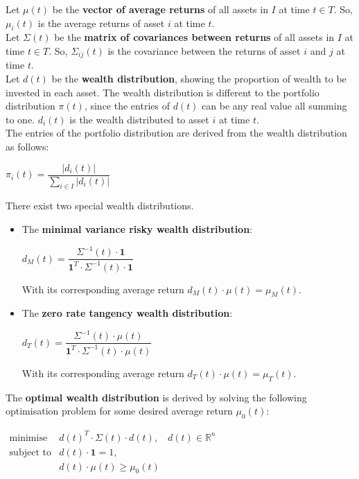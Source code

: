 \documentclass[11pt]{article}
\begin{document}
Let $\mu(t)$ be the \textbf{vector of average returns} of all assets in $I$ at time $t \in T$. So, $\mu_{i}(t)$ is the average returns of asset $i$ at time $t$.\\

Let $\Sigma(t)$ be the \textbf{matrix of covariances between returns} of all assets in $I$ at time $t \in T$. So, $\Sigma_{ij}(t)$ is the covariance between the returns of asset $i$ and $j$ at time $t$.\\

Let $d(t)$ be the \textbf{wealth distribution}, showing the proportion of wealth to be invested in each asset. The wealth distribution is different to the portfolio distribution $\pi(t)$, since the entries of $d(t)$ can be any real value all summing to one. $d_i(t)$ is the wealth distributed to asset $i$ at time $t$.\\

The entries of the portfolio distribution are derived from the wealth distribution as follows:
\begin{center}
    $\pi_i(t) = \dfrac{|d_i(t)|}{\sum_{i \in I}|d_i(t)|}$
\end{center}



\newpage

There exist two special wealth distributions.
\begin{itemize}
    \item The \textbf{minimal variance risky wealth distribution}:
    \begin{center}
        $d_M(t) = \dfrac{\Sigma^{-1}(t) \cdot \mathbf{1}}{\mathbf{1}^{T} \cdot \Sigma^{-1}(t) \cdot \mathbf{1}}$
    \end{center}
    With its corresponding average return $d_M(t) \cdot \mu(t)= \mu_M(t)$.
    \item The \textbf{zero rate tangency wealth distribution}:
    \begin{center}
        $d_T(t) = \dfrac{\Sigma^{-1}(t) \cdot \mu(t)}{\mathbf{1}^{T} \cdot \Sigma^{-1}(t) \cdot \mu(t)}$
    \end{center}
    With its corresponding average return $d_T(t) \cdot \mu(t)= \mu_T(t)$.
\end{itemize}


The \textbf{optimal wealth distribution} is derived by solving the following optimisation problem for some desired average return $\mu_0(t)$:
\begin{center}
        $\begin{matrix}
\text{minimise} & d(t)^T \cdot \Sigma(t) \cdot d(t), & d(t) \in \mathbb{R}^{n} \\
\text{subject to} & d(t) \cdot \mathbf{1}=1, & \\ 
 & d(t) \cdot \mu(t) \geq \mu_0(t) & 
\end{matrix}$
    \end{center}
\end{document}
